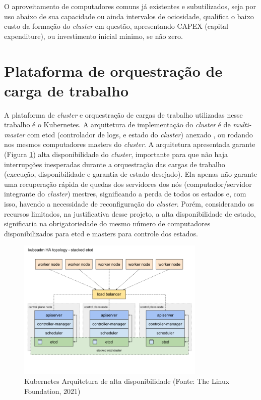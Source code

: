 O aproveitamento de computadores comuns já existentes e subutilizados, seja por uso abaixo de sua capacidade ou ainda intervalos de ociosidade, qualifica o baixo custo da formação do  \emph{cluster} em questão, apresentando CAPEX (capital expenditure),  ou investimento inicial mínimo, se não zero.
\section{Plataforma de orquestração de carga de trabalho}

A plataforma de  \emph{cluster} e orquestração de cargas de trabalho utilizadas nesse trabalho é o Kubernetes. A arquitetura de implementação do  \emph{cluster} é de \emph{multi-master} com etcd \cite{etcd2022} (controlador de logs, e estado do  \emph{cluster}) anexado \cite{kubernetes2022}, ou rodando nos mesmos computadores masters do  \emph{cluster}.
A arquitetura apresentada garante  (Figura \ref{fig:kubeadmha}) alta disponibilidade do  \emph{cluster}, importante para que não haja interrupções inesperadas durante a orquestração das cargas de trabalho (execução, disponibilidade e garantia de estado desejado). Ela apenas não garante uma recuperação rápida de quedas dos servidores dos nós (computador/servidor integrante do \emph{cluster}) mestres, significando a perda de todos os estados e, com isso, havendo a necessidade de reconfiguração do  \emph{cluster}. Porém, considerando os recursos limitados, na justificativa desse projeto, a alta disponibilidade de estado, significaria na obrigatoriedade do mesmo número de computadores disponibilizados para etcd e masters para controle dos estados.


\begin{figure}[!ht]
    \centering
    \includegraphics[width=0.8\textwidth]{04-figuras/kubeadm-ha-topology-stacked-etcd.png}
    \caption[Kubernetes Arquitetura de alta disponibilidade]{Kubernetes Arquitetura de alta disponibilidade (Fonte: The Linux Foundation\textregistered, 2021)}
    \label{fig:kubeadmha}
\end{figure}


